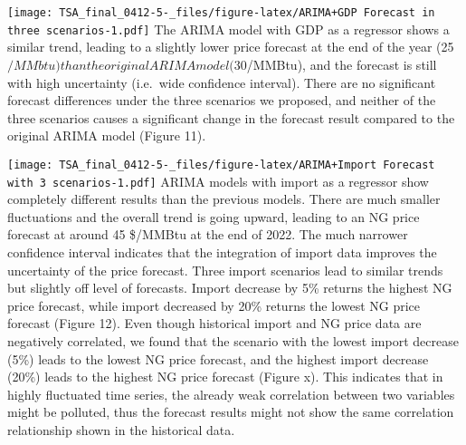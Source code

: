 \documentclass[
]{article}
\begin{document}
\texttt{[image: TSA\_final\_0412-5-\_files/figure-latex/ARIMA+GDP Forecast in three scenarios-1.pdf]}
The ARIMA model with GDP as a regressor shows a similar trend, leading
to a slightly lower price forecast at the end of the year
(25\(/MMbtu) than the original ARIMA model (30\)/MMBtu), and the
forecast is still with high uncertainty (i.e.~wide confidence interval).
There are no significant forecast differences under the three scenarios
we proposed, and neither of the three scenarios causes a significant
change in the forecast result compared to the original ARIMA model
(Figure 11).

\texttt{[image: TSA\_final\_0412-5-\_files/figure-latex/ARIMA+Import Forecast with 3 scenarios-1.pdf]}
ARIMA models with import as a regressor show completely different
results than the previous models. There are much smaller fluctuations
and the overall trend is going upward, leading to an NG price forecast
at around 45 \$/MMBtu at the end of 2022. The much narrower confidence
interval indicates that the integration of import data improves the
uncertainty of the price forecast. Three import scenarios lead to
similar trends but slightly off level of forecasts. Import decrease by
5\% returns the highest NG price forecast, while import decreased by
20\% returns the lowest NG price forecast (Figure 12). Even though
historical import and NG price data are negatively correlated, we found
that the scenario with the lowest import decrease (5\%) leads to the
lowest NG price forecast, and the highest import decrease (20\%) leads
to the highest NG price forecast (Figure x). This indicates that in
highly fluctuated time series, the already weak correlation between two
variables might be polluted, thus the forecast results might not show
the same correlation relationship shown in the historical data.
\end{document}

